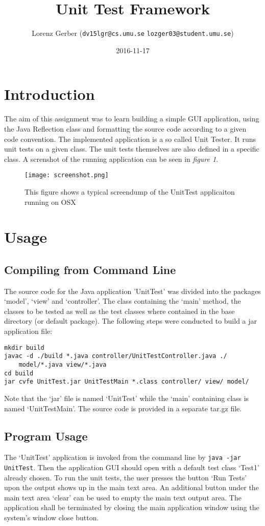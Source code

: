 \documentclass[a4paper,11pt,twoside]{article}
\title{Unit Test Framework}
\author{Lorenz Gerber ({\tt{dv15lgr@cs.umu.se}} {\tt{lozger03@student.umu.se}})}
\date{2016-11-17}
\begin{document}
\lstset{language=C}
\maketitle
\thispagestyle{empty}
\newpage
\tableofcontents
\thispagestyle{empty}
\newpage

\clearpage
{}

\section{Introduction}
The aim of this assignment was to learn building a simple GUI application, using the Java Reflection class and formatting the source code according to a given code convention. The implemented application is a so called Unit Tester. It runs unit tests on a given class. The unit tests themselves are also defined in a specific class. A screnshot of the running application can be seen in \textit{figure 1}.  

\begin{figure}[p]
    \centering
    \texttt{[image: screenshot.png]}
    \caption{This figure shows a typical screendump of the UnitTest applicaiton running on OSX}
    \label{fig:screenshot}
\end{figure}

\section{Usage} 
\subsection{Compiling from Command Line}
The source code for the Java application 'UnitTest' was divided into the packages `model', `view' and `controller'. The class containing the `main' method, the classes to be tested as well as the test classes where contained in the base directory (or default package). The following steps were conducted to build a jar application file:
\begin{verbatim}
mkdir build
javac -d ./build *.java controller/UnitTestController.java ./
    model/*.java view/*.java
cd build
jar cvfe UnitTest.jar UnitTestMain *.class controller/ view/ model/
\end{verbatim} 
Note that the `jar' file is named `UnitTest' while the `main' containing class is named `UnitTestMain'.
The source code is provided in a separate tar.gz file.

\subsection{Program Usage}
The `UnitTest' application is invoked from the command line by \verb+java -jar UnitTest+. Then the application GUI should open with a default test class `Test1' already chosen. To run the unit tests, the user presses the button `Run Tests' upon the output shows up in the main text area. An additional button under the main text area `clear' can be used to empty the main text output area. The application shall be terminated by closing the main application window using the system's window close button.
\end{document}
